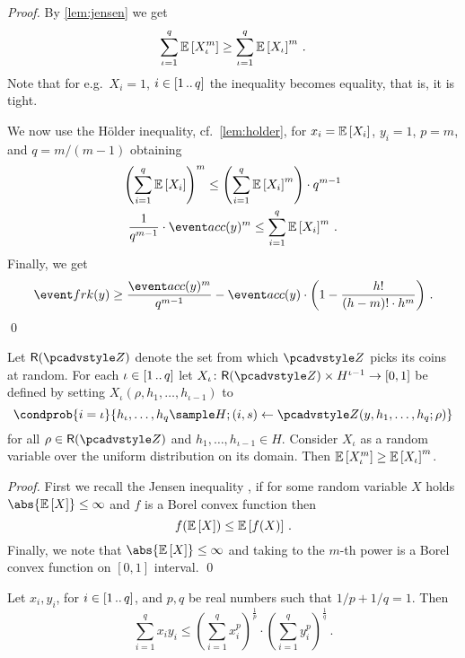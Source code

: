 \begin{proof}
By \cref{lem:jensen} we get
\[
	\sum_{\iota = 1}^{q} \mathbb{E}\left[X_\iota^m\right] \geq \sum_{\iota = 1}^{q} \mathbb{E}\left[X_\iota\right]^m\,.
\]
Note that for e.g.~$X_i = 1$, $i \in [1 \, .. \, q]$ the inequality becomes equality, that is, it is tight.
 
We now use the H\"older inequality, cf.~\cref{lem:holder}, for $x_i = \mathbb{E}\left[X_i\right]$, $y_i = 1$, $p = m$, and $q = m/(m - 1)$ obtaining
\begin{gather}
	\left(\sum_{i = 1}^{q} \expected{X_i}\right)^{m}  \leq \left(\sum_{i = 1}^{q} \expected{X_i}^m\right) \cdot q^{m - 1}\\
	\frac{1}{q^{m - 1}} \cdot \accProb(y)^{m} \leq \sum_{i = 1}^{q} \expected{X_i}^m\,.
\end{gather}
Finally, we get
\[
	\frkProb(y) \geq \frac{\accProb(y)^m}{q^{m - 1}} - 
	 \accProb(y) \cdot \left(1 - \frac{h!}{(h - m)! \cdot h^m}\right)\,.
\]
\qed
\end{proof}
\begin{lemma}\label{lem:jensen}
	Let $\RND{\zdv}$ denote the set from which $\zdv$ picks its coins at random.
	For each $\iota \in [1 \, .. \, q]$ let $X_\iota \colon \RND{\zdv} \times
	H^{\iota - 1} \to [0, 1]$ be defined by setting $X_\iota(\rho, h_1, \ldots,
h_{\iota - 1})$ to 
\[
  \condprob{i = \iota}{h_\iota, \ldots, h_q \sample H; (i, s) \gets \zdv(y, h_1,
    \ldots, h_q; \rho)}
	\] 
	for all $\rho \in \RND{\zdv}$ and $h_1, \ldots, h_{\iota - 1} \in H$. Consider
  $X_\iota$ as a random variable over the uniform distribution on its domain.
  Then $\mathbb{E}\left[X_\iota^m\right] \geq \mathbb{E}\left[X_\iota\right]^m$.
\end{lemma}
\begin{proof}
	First we recall the Jensen inequality \cite{W:Weissten20}, if for some random
  variable $X$ holds $\abs{\expected{X}} \leq \infty$ and $f$ is a Borel convex
  function then
	\[
		f(\mathbb{E}\left[X\right]) \leq \mathbb{E}\left[f(X)\right]\,.
	\] 
	Finally, we note that $\abs{\expected{X}} \leq \infty$ and taking to the
  $m$-th power is a Borel convex function on $[0, 1]$ interval. \qed
\end{proof}

\begin{lemma}\label{lem:holder}
	Let $x_i, y_i$, for $i \in [1 \, .. \, q]$, and $p, q$ be real numbers such that
  $1/p + 1/q = 1$. Then
	\begin{equation}
    \label{eq:tightness}
		\sum_{i = 1}^{q} x_i y_i \leq \left(\sum_{i = 1}^{q}
      x_i^p\right)^{\frac{1}{p}} \cdot \left(\sum_{i = 1}^{q}
      y_i^p\right)^{\frac{1}{q}}\,.
	\end{equation}
\end{lemma}

